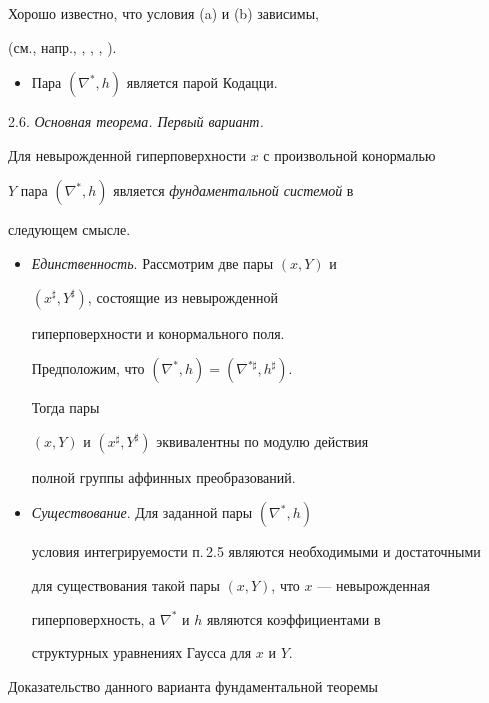 Хорошо известно, что условия (a) и (b) зависимы,


(см., напр., \cite{EIS}, \cite{SCHI}, \cite{NOM-SA}, \cite{SIM-S-V}).


\begin{itemize}


\item[(ii)]


Пара $(\nabla^*, h)$ является парой Кодацци.


\end{itemize}





2.6. {\it Основная теорема. Первый вариант.}


Для невырожденной гиперповерхности $x$ с произвольной конормалью


$Y$ пара $(\nabla^*, h)$ является {\it фундаментальной системой} в


следующем смысле.


\begin{itemize}


\item[(i)] {\it Единственность}. Рассмотрим две пары $(x, Y)$ и


$(x^{\sharp}, Y^{\sharp})$, состоящие из невырожденной


гиперповерхности и конормального поля.


Предположим, что $(\nabla^*, h)= (\nabla^{* \sharp},h^\sharp)$.


Тогда пары


$(x, Y)$ и $(x^\sharp, Y^\sharp)$ эквивалентны по модулю действия


полной группы аффинных преобразований.


\item[(ii)] {\it Существование}. Для заданной пары $(\nabla^*, h)$


условия интегрируемости п.\,2.5 являются необходимыми и достаточными


для существования такой пары $(x, Y)$, что $x$ --- невырожденная


гиперповерхность, а $\nabla^*$ и $h$ являются коэффициентами в 


структурных уравнениях Гаусса для $x$ и $Y$.


\end{itemize}





Доказательство данного варианта фундаментальной теоремы


